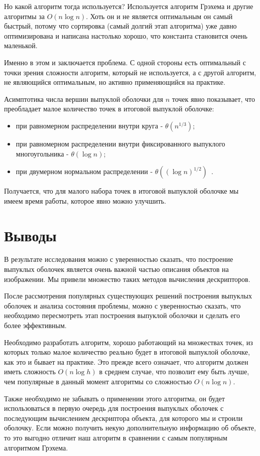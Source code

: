 Но какой алгоритм тогда используется? Используется алгоритм Грэхема и другие алгоритмы за $O(n \log n)$. Хоть он и не является оптимальным он самый быстрый, потому что сортировка (самый долгий этап алгоритма) уже давно оптимизирована и написана настолько хорошо, что константа становится очень маленькой.

Именно в этом и заключается проблема. С одной стороны есть оптимальный с точки зрения сложности алгоритм, который не используется, а с другой алгоритм, не являющийся оптимальным, но активно применяющийся на практике.

Асимптотика числа вершин выпуклой оболочки для $n$ точек явно показывает, что преобладает малое количество точек в итоговой выпуклой оболочке:
\begin{itemize}
	\item при равномерном распределении внутри круга - $\theta( n^{1/3} )$;
	\item при равномерном распределении внутри фиксированного выпуклого многоугольника - $\theta(\log n)$;
	\item при двумерном нормальном распределении - $\theta((\log n)^{1/2})$~\cite{algolist2010convexhull}.
\end{itemize}

Получается, что для малого набора точек в итоговой выпуклой оболочке мы имеем время работы, которое явно можно улучшить.

\section{Выводы} \label{subsect1_4}

В результате исследования можно с уверенностью сказать, что построение выпуклых оболочек является очень важной частью описания объектов на изображении. Мы привели множество таких методов вычисления дескрипторов.

После рассмотрения популярных существующих решений построения выпуклых оболочек и анализа состояния проблемы, можно с уверенностью сказать, что необходимо пересмотреть этап построения выпуклой оболочки и сделать его более эффективным.

Необходимо разработать алгоритм, хорошо работающий на множествах точек, из которых только малое количество реально будет в итоговой выпуклой оболочке, как это и бывает на практике. Это прежде всего означает, что алгоритм должен иметь сложность $O(n \log{h})$ в среднем случае, что позволит ему быть лучше, чем популярные в данный момент алгоритмы со сложностью $O(n \log{n})$.

Также необходимо не забывать о применении этого алгоритма, он будет использоваться в первую очередь для построения выпуклых оболочек с последующим вычислением дескриптора объекта, для которого мы и строили оболочку. Если можно получить некую дополнительную информацию об объекте, то это выгодно отличит наш алгоритм в сравнении с самым популярным алгоритмом Грэхема.

